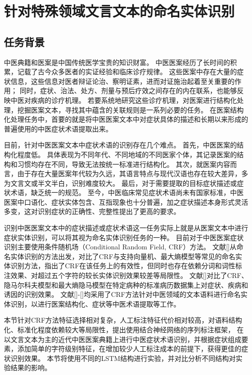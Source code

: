 \chapter{针对特殊领域文言文本的命名实体识别}
\section{任务背景}
中医典籍和医案是中国传统医学宝贵的知识财富。
中医医案经历了长时间的积累，记载了古今众多医者的实证经验和临床诊疗规律。
这些医案中存在大量的症状信息，这些信息对医者辩证论治、察明证素，进而对证施治起着至关重要的作用；
同时，症状、治法、处方、剂量与预后疗效之间存在的内在联系，也能够反映中医对疾病的诊疗机理。
若要系统地研究这些诊疗机理，对医案进行结构化处理，挖掘医案文本，寻找其中蕴含的关联规则是一系列必要的任务。
在医案结构化处理任务中，首要的就是将中医医案文本中对症状具体的描述和长期以来形成的普遍使用的中医症状术语提取出来。

目前，针对中医医案文本中症状术语的识别存在几个难点。
首先，中医医案的结构化程度低。
具体表现为不同年代、不同地域的不同医家个体，其记录医案的结构和习惯均存在不同，导致无法按统一标准进行结构化。
其次，就医案内容而言，由于存在大量医案年代较为久远，其语言特点与现代汉语也存在较大差异，多为文言文或半文半白，识别难度较大。
最后，对于需要提取的目标症状描述或症状术语，缺乏统一的规范。
至今，中医临床常见症状术语尚未有国家标准，中医医案中口语化、症状实体包含、互指现象也十分普遍，加之症状描述本身形式灵活多变，这对识别症状的正确性、完整性提出了更高的要求。

识别中医医案文本中的症状描述或症状术语这一任务实际上就是从医案文本中进行症状实体识别，可以将其视为命名实体识别任务的一种。
目前对于中医医案症状识别主要使用条件随机场（Conditional Random Field, CRF）方法。
文献[]从命名实体识别的方法出发，对比了CRF与支持向量机、最大熵模型等常见的命名实体识别方法，指出了CRF在该任务上的有效性，但同时也存在依赖分词和词性标注效果、对超过五个字符的较长实体识别效果较差等局限性。
文献[]对比了CRF、隐马尔科夫模型和最大熵隐马模型在特定病种的标准病历数据集上对症状、疾病和诱因的识别效果。
文献[]-[]均采用了CRF方法针对中医领域的文本语料进行命名实体识别，以进行医案结构化、症状等中医术语提取等工作。

本节针对CRF方法特征选择相对复杂，人工标注特征代价相对较高，对语料结构化、标准化程度依赖较大等局限性，提出使用结合神经网络的序列标注框架，
在以文言文本为主的近代中医医案典籍上进行中医症状术语识别，并根据症状组成要素，添加简单的字符级别特征，在增加较少人工标注成本的前提下，获得更佳的症状识别效果。
本节将使用不同的LSTM结构进行实验，并对比分析不同结构对实验结果的影响。

